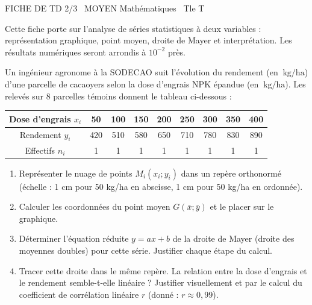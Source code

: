 \documentclass[11pt]{article}
\begin{document}
\begin{tcolorbox}[enhanced,colback=popink,colframe=popink,arc=10pt,boxrule=0pt,left=12pt,right=12pt,top=9pt,bottom=9pt]
{\color{white}\popxbold\small FICHE DE TD 2/3 \textbullet\ MOYEN \hfill Mathématiques \textbullet\ Tle T\par}
\end{tcolorbox}
\vspace{4pt}
\noindent Cette fiche porte sur l'analyse de séries statistiques à deux variables : représentation graphique, point moyen, droite de Mayer et interprétation. Les résultats numériques seront arrondis à $10^{-2}$ près.

\begin{exercice}
Un ingénieur agronome à la SODECAO suit l'évolution du rendement (en $\SI{}{\kilogram\per\hectare}$) d'une parcelle de cacaoyers selon la dose d'engrais NPK épandue (en $\SI{}{\kilogram\per\hectare}$). Les relevés sur 8 parcelles témoins donnent le tableau ci-dessous :
\begin{center}
\begin{tabular}{|c|c|c|c|c|c|c|c|c|}
\hline
Dose d'engrais $x_i$ & 50 & 100 & 150 & 200 & 250 & 300 & 350 & 400 \\ \hline
Rendement $y_i$ & 420 & 510 & 580 & 650 & 710 & 780 & 830 & 890 \\ \hline
Effectifs $n_i$ & 1 & 1 & 1 & 1 & 1 & 1 & 1 & 1 \\ \hline
\end{tabular}
\end{center}
\begin{enumerate}
    \item Représenter le nuage de points $M_i(x_i ; y_i)$ dans un repère orthonormé (échelle : 1 cm pour 50 kg/ha en abscisse, 1 cm pour 50 kg/ha en ordonnée).
    \item Calculer les coordonnées du point moyen $G(\bar{x} ; \bar{y})$ et le placer sur le graphique.
    \item Déterminer l'équation réduite $y = ax + b$ de la droite de Mayer (droite des moyennes doubles) pour cette série. Justifier chaque étape du calcul.
    \item Tracer cette droite dans le même repère. La relation entre la dose d'engrais et le rendement semble-t-elle linéaire ? Justifier visuellement et par le calcul du coefficient de corrélation linéaire $r$ (donné : $r \approx 0,99$).
\end{enumerate}
\end{exercice}
\end{document}
